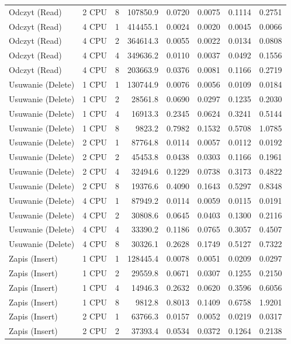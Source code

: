 \begin{table}[ht]
{\begin{tabular}{llcrrrrr}
Odczyt (Read) & 2 CPU & 8 & 107850.9 & 0.0720 & 0.0075 & 0.1114 & 0.2751 \\
Odczyt (Read) & 4 CPU & 1 & 414455.1 & 0.0024 & 0.0020 & 0.0045 & 0.0066 \\
Odczyt (Read) & 4 CPU & 2 & 364614.3 & 0.0055 & 0.0022 & 0.0134 & 0.0808 \\
Odczyt (Read) & 4 CPU & 4 & 349636.2 & 0.0110 & 0.0037 & 0.0492 & 0.1556 \\
Odczyt (Read) & 4 CPU & 8 & 203663.9 & 0.0376 & 0.0081 & 0.1166 & 0.2719 \\
Usuwanie (Delete) & 1 CPU & 1 & 130744.9 & 0.0076 & 0.0056 & 0.0109 & 0.0184 \\
Usuwanie (Delete) & 1 CPU & 2 & 28561.8 & 0.0690 & 0.0297 & 0.1235 & 0.2030 \\
Usuwanie (Delete) & 1 CPU & 4 & 16913.3 & 0.2345 & 0.0624 & 0.3241 & 0.5144 \\
Usuwanie (Delete) & 1 CPU & 8 & 9823.2 & 0.7982 & 0.1532 & 0.5708 & 1.0785 \\
Usuwanie (Delete) & 2 CPU & 1 & 87764.8 & 0.0114 & 0.0057 & 0.0112 & 0.0192 \\
Usuwanie (Delete) & 2 CPU & 2 & 45453.8 & 0.0438 & 0.0303 & 0.1166 & 0.1961 \\
Usuwanie (Delete) & 2 CPU & 4 & 32494.6 & 0.1229 & 0.0738 & 0.3173 & 0.4822 \\
Usuwanie (Delete) & 2 CPU & 8 & 19376.6 & 0.4090 & 0.1643 & 0.5297 & 0.8348 \\
Usuwanie (Delete) & 4 CPU & 1 & 87949.2 & 0.0114 & 0.0059 & 0.0115 & 0.0191 \\
Usuwanie (Delete) & 4 CPU & 2 & 30808.6 & 0.0645 & 0.0403 & 0.1300 & 0.2116 \\
Usuwanie (Delete) & 4 CPU & 4 & 33390.2 & 0.1186 & 0.0765 & 0.3057 & 0.4507 \\
Usuwanie (Delete) & 4 CPU & 8 & 30326.1 & 0.2628 & 0.1749 & 0.5127 & 0.7322 \\
Zapis (Insert) & 1 CPU & 1 & 128445.4 & 0.0078 & 0.0051 & 0.0209 & 0.0297 \\
Zapis (Insert) & 1 CPU & 2 & 29559.8 & 0.0671 & 0.0307 & 0.1255 & 0.2150 \\
Zapis (Insert) & 1 CPU & 4 & 14946.3 & 0.2632 & 0.0620 & 0.3596 & 0.6056 \\
Zapis (Insert) & 1 CPU & 8 & 9812.8 & 0.8013 & 0.1409 & 0.6758 & 1.9201 \\
Zapis (Insert) & 2 CPU & 1 & 63766.3 & 0.0157 & 0.0052 & 0.0219 & 0.0317 \\
Zapis (Insert) & 2 CPU & 2 & 37393.4 & 0.0534 & 0.0372 & 0.1264 & 0.2138 \\

\end{tabular}}
\end{table}
